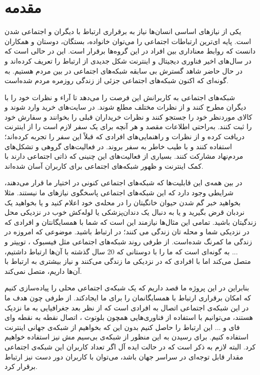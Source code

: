 

\chapter{مقدمه}
\thispagestyle{empty}
یکی از نیازهای اساسی انسان‌ها نیاز به برقراری ارتباط با دیگران و اجتماعی شدن است. پایه ای‌ترین ارتباطات اجتماعی را می‌توان خانواده، بستگان، دوستان و همکاران دانست که روابط معناداری بین افراد در این گروه‌ها برقرار است. این در حالی است که در سال‌های اخیر فناوری دیجیتال و اینترنت شکل جدیدی از ارتباط را تعریف کرده‌اند و در حال حاضر شاهد گسترش بی سابقه شبکه‌های اجتماعی
 در بین مردم هستیم. به گونه‌ای که اکنون شبکه‌های اجتماعی جزئی از زندگی روزمره مردم شده‌است. 
 
 شبکه‌های اجتماعی به کاربرانش این فرصت را می‌دهد تا آراء و نظرات خود را با دیگران مطرح کنند و از نظرات مختلف مطلع شوند. در سایت‌های خرید وارد شوند و کالای موردنظر خود را جستجو کنند و نظرات خریداران قبلی را بخوانند و سفارش خود را ثبت کنند. به‌راحتی اطلاعات مقصد و هر آنچه برای یک سفر لازم است را از اینترنت دریافت کرده و از نظرات و راهنمایی‌های افرادی که قبلاً این سفر را تجربه کرده‌اند؛ استفاده کنند و با طیب خاطر به سفر بروند. در فعالیت‌های گروهی و تشکل‌های مردم‌نهاد مشارکت کنند. بسیاری از فعالیت‌های این چنینی که ذاتی اجتماعی دارند با کمک اینترنت و ظهور شبکه‌های اجتماعی برای کاربران آسان شده‌اند.
 
در بین همه‌ی این قابلیت‌ها که شبکه‌های اجتماعی کنونی در اختیار ما قرار می‌دهند، شرایطی وجود دارد که این شبکه‌های اجتماعی پاسخگوی نیاز‌های ما نیستند. مثلا بخواهید خبر گم شدن حیوان خانگیتان را در محله‌ی خود اعلام کنید و یا بخواهید یک نردبان قرض بگیرید و یا به دنبال یک دندان‌پزشکی یا لوله‌کش خوب در نزدیکی محل زندگیتان باشید. تمامی این مثال‌ها نیازمند این است که شما با همسایگانتان و افرادی که در نزدیکی شما و محله تان زندگی می کنند؛ در ارتباط باشید. موضوعی که امروزه در زندگی ما کمرنگ شده‌است. از طرفی روند شبکه‌های اجتماعی مثل فیسبوک
، توییتر 
و ... به گونه‌ای است که ما را با دوستانی که 20 سال گذشته با آن‌ها ارتباط داشتیم، متصل می‌کند اما با افرادی که در نزدیکی ما زندگی می‌کنند و نیاز بیشتری به ارتباط با آن‌ها داریم، متصل نمی‌کند.

بنابراین در این پروژه ما قصد داریم که یک شبکه‌ی اجتماعی محلی را پیاده‌سازی کنیم که امکان برقراری ارتباط با همسایگانمان را برای ما ایجاد‌کند. از طرفی چون هدف ما در این شبکه‌ی اجتماعی اتصال به افرادی است که از نظر بعد جغرافیایی به ما نزدیک هستند، می‌توانیم با استفاده از فناوری‌‌هایی همچون بلوتوث
، اتصال نقطه به نقطه وای فای 
و ... این ارتباط را حاصل کنیم بدون این که بخواهیم از شبکه‌ی جهانی اینترنت
 استفاده کنیم. برای رسیدن به این منظور از شبکه‌ی بی‌سیم مش 
 نیز استفاده خواهیم کرد. البته لازم به ذکر است که در حالت ایده آل اگر تعداد کاربران این شبکه‌ی اجتماعی مقدار قابل توجه‌ای در سراسر جهان باشد، می‌توان با کاربران دور دست نیز ارتباط برقرار کرد. 

